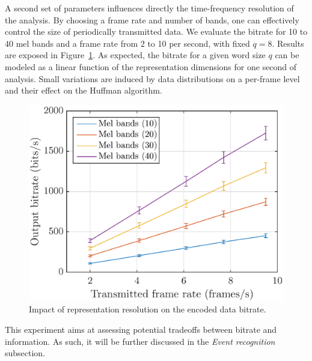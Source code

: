 \documentclass[final,3p,times,twocolumn]{elsarticle}
\begin{document}
A second set of parameters influences directly the time-frequency resolution of the analysis. By choosing a frame rate and number of bands, one can effectively control the size of periodically transmitted data. We evaluate the bitrate for 10 to 40 mel bands and a frame rate from 2 to 10 per second, with fixed $q = 8$. Results are exposed in Figure~\ref{fig:bitrate_mel_avg}. As expected, the bitrate for a given word size $q$ can be modeled as a linear function of the representation dimensions for one second of analysis. Small variations are induced by data distributions on a per-frame level and their effect on the Huffman algorithm.

\begin{figure}[htbp]
	\centering
		\includegraphics[width=\columnwidth]{bitrate_mel_avg.eps}
	\caption{Impact of representation resolution on the encoded data bitrate.}
	\label{fig:bitrate_mel_avg}
\end{figure}

This experiment aims at assessing potential tradeoffs between bitrate and information. As such, it will be further discussed in the \textit{Event recognition} subsection.\\
\end{document}
